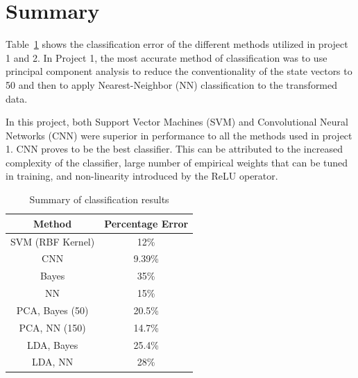 \documentclass[12pt]{article}
\begin{document}
\section{Summary}
Table~\ref{table:1} shows the classification error of the different methods utilized in project 1 and 2. In Project 1, the most accurate method of classification was to use principal component analysis to reduce the conventionality of the state vectors to 50 and then to apply Nearest-Neighbor (NN) classification to the transformed data.

In this project, both Support Vector Machines (SVM) and Convolutional Neural Networks (CNN) were superior in performance to all the methods used in project 1. CNN proves to be the best classifier. This can be attributed to the increased complexity of the classifier, large number of empirical weights that can be tuned in training, and non-linearity introduced by the ReLU operator. 
\begin{table}[H]
\centering
\caption{Summary of classification results}
\label{table:1}
\begin{tabular}{cc}
\hline
Method     & Percentage Error \\ \hline
SVM (RBF Kernel)      & 12\%  \\
CNN         & 9.39\%          \\
Bayes      & 35\%             \\
NN         & 15\%             \\
PCA, Bayes (50) & 20.5\%      \\
PCA, NN  (150)  & 14.7\%      \\
LDA, Bayes & 25.4\%           \\
LDA, NN    & 28\%             \\ \hline
\end{tabular}
\end{table}

\end{document}
